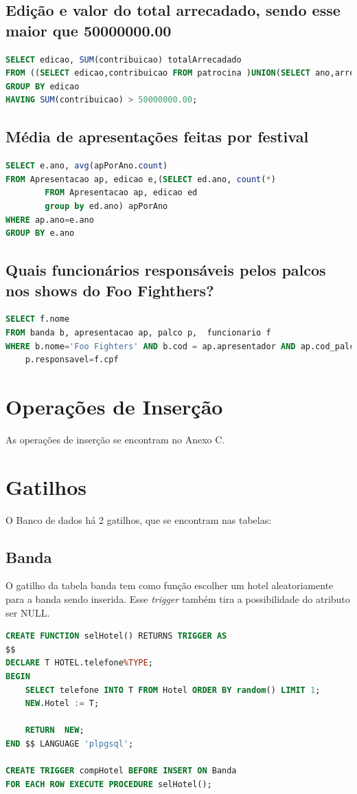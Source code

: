\documentclass[12pt]{article}
\begin{document}
\subsection{Edição e valor do total arrecadado, sendo esse maior que 50000000.00}
\begin{lstlisting}[language=sql]
SELECT edicao, SUM(contribuicao) totalArrecadado
FROM ((SELECT edicao,contribuicao FROM patrocina )UNION(SELECT ano,arrecadacao FROM EDICAO))total
GROUP BY edicao
HAVING SUM(contribuicao) > 50000000.00;
\end{lstlisting}

\subsection{Média de apresentações feitas por festival}
\begin{lstlisting}[language=sql]
SELECT e.ano, avg(apPorAno.count)
FROM Apresentacao ap, edicao e,(SELECT ed.ano, count(*)
		FROM Apresentacao ap, edicao ed
		group by ed.ano) apPorAno
WHERE ap.ano=e.ano
GROUP BY e.ano
\end{lstlisting}

\subsection{Quais funcionários responsáveis pelos palcos nos shows do Foo Fighthers?}
\begin{lstlisting}[language=sql]
SELECT f.nome
FROM banda b, apresentacao ap, palco p,  funcionario f
WHERE b.nome='Foo Fighters' AND b.cod = ap.apresentador AND ap.cod_palco = p.cod AND
	p.responsavel=f.cpf
\end{lstlisting}

\section{Operações de Inserção}
As operações de inserção se encontram no Anexo C.
\section{Gatilhos}
O Banco de dados há 2 gatilhos, que se encontram nas tabelas:
\subsection{Banda}
O gatilho da tabela banda tem como função escolher um hotel aleatoriamente para a banda sendo inserida. Esse \textit{trigger} também tira a possibilidade do atributo ser NULL.
\begin{lstlisting}[language=sql]
CREATE FUNCTION selHotel() RETURNS TRIGGER AS 
$$
DECLARE T HOTEL.telefone%TYPE;
BEGIN
	SELECT telefone INTO T FROM Hotel ORDER BY random() LIMIT 1;
	NEW.Hotel := T;
	
	RETURN 	NEW;
END $$ LANGUAGE 'plpgsql';

CREATE TRIGGER compHotel BEFORE INSERT ON Banda 
FOR EACH ROW EXECUTE PROCEDURE selHotel();
\end{lstlisting}
\end{document}
